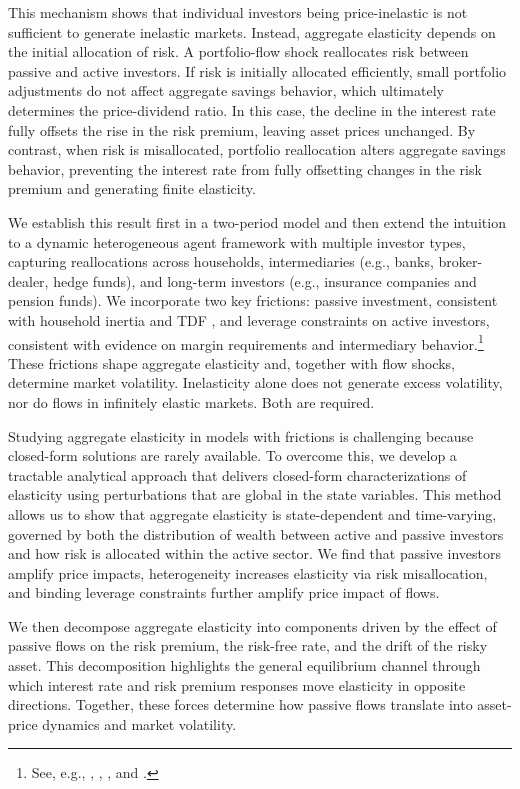 This mechanism shows that individual investors being price-inelastic is not sufficient to generate inelastic markets. Instead, aggregate elasticity depends on the initial allocation of risk. A portfolio-flow shock reallocates risk between passive and active investors. If risk is initially allocated efficiently, small portfolio adjustments do not affect aggregate savings behavior, which ultimately determines the price-dividend ratio. In this case, the decline in the interest rate fully offsets the rise in the risk premium, leaving asset prices unchanged. By contrast, when risk is misallocated, portfolio reallocation alters aggregate savings behavior, preventing the interest rate from fully offsetting changes in the risk premium and generating finite elasticity.


We establish this result first in a two-period model and then extend the intuition to a dynamic heterogeneous agent framework with multiple investor types, capturing reallocations across households, intermediaries (e.g., banks, broker-dealer, hedge funds), and long-term investors (e.g., insurance companies and pension funds).
We incorporate two key frictions: passive investment, consistent with household inertia and TDF , and leverage constraints on active investors, consistent with evidence on margin requirements and intermediary behavior.\footnote{See, e.g., \citet{brunnermeier2009market}, \citet{garleanu2011margin}, \citet{chabakauri2013dynamic}, and \citet{adrian2014procyclical}.} These frictions shape aggregate elasticity and, together with flow shocks, determine market volatility. Inelasticity alone does not generate excess volatility, nor do flows in infinitely elastic markets. Both are required.  

Studying aggregate elasticity in models with frictions is challenging because closed-form solutions are rarely available. To overcome this, we develop a tractable analytical approach that delivers closed-form characterizations of elasticity using perturbations that are global in the state variables. This method allows us to show that aggregate elasticity is state-dependent and time-varying, governed by both the distribution of wealth between active and passive investors and how risk is allocated within the active sector. We find that passive investors amplify price impacts, heterogeneity increases elasticity via risk misallocation, and binding leverage constraints further amplify price impact of flows.  

We then decompose aggregate elasticity into components driven by the effect of passive flows on the risk premium, the risk-free rate, and the drift of the risky asset. This decomposition highlights the general equilibrium channel through which interest rate and risk premium responses move elasticity in opposite directions. Together, these forces determine how passive flows translate into asset-price dynamics and market volatility.

